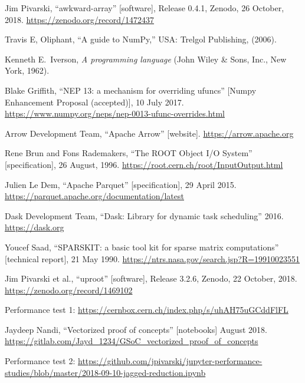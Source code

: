 \documentclass{webofc}
\begin{document}
\begin{thebibliography}{8}

 Jim Pivarski, ``awkward-array'' [software], Release 0.4.1, Zenodo, 26 October, 2018. \textcolor{blue}{\url{https://zenodo.org/record/1472437}}

 Travis E, Oliphant, ``A guide to NumPy,'' USA: Trelgol Publishing, (2006).

 Kenneth E.\ Iverson, \textit{A programming language} (John Wiley \& Sons, Inc., New York, 1962).

 Blake Griffith, ``NEP 13: a mechanism for overriding ufuncs'' [Numpy Enhancement Proposal (accepted)], 10 July 2017. \textcolor{blue}{\url{https://www.numpy.org/neps/nep-0013-ufunc-overrides.html}}

 Arrow Development Team, ``Apache Arrow'' [website]. \textcolor{blue}{\url{https://arrow.apache.org}}

 Rene Brun and Fons Rademakers, ``The ROOT Object I/O System'' [specification], 26 August, 1996. \textcolor{blue}{\url{https://root.cern.ch/root/InputOutput.html}}

 Julien Le Dem, ``Apache Parquet'' [specification], 29 April 2015. \textcolor{blue}{\url{https://parquet.apache.org/documentation/latest}}

 Dask Development Team, ``Dask: Library for dynamic task scheduling'' 2016. \textcolor{blue}{\url{https://dask.org}}

 Youcef Saad, ``SPARSKIT: a basic tool kit for sparse matrix computations'' [technical report], 21 May 1990. \textcolor{blue}{\url{https://ntrs.nasa.gov/search.jsp?R=19910023551}}

 Jim Pivarski et al., ``uproot'' [software], Release 3.2.6, Zenodo, 22 October, 2018. \textcolor{blue}{\url{https://zenodo.org/record/1469102}}

 Performance test 1: \textcolor{blue}{\url{https://cernbox.cern.ch/index.php/s/uhAH75uGCddFlFL}}

 Jaydeep Nandi, ``Vectorized proof of concepts'' [notebooks] August 2018. \\ \textcolor{blue}{\url{https://gitlab.com/Jayd_1234/GSoC_vectorized_proof_of_concepts}}

 Performance test 2: \textcolor{blue}{\url{https://github.com/jpivarski/jupyter-performance-studies/blob/master/2018-09-10-jagged-reduction.ipynb}}


\end{thebibliography}
\end{document}
